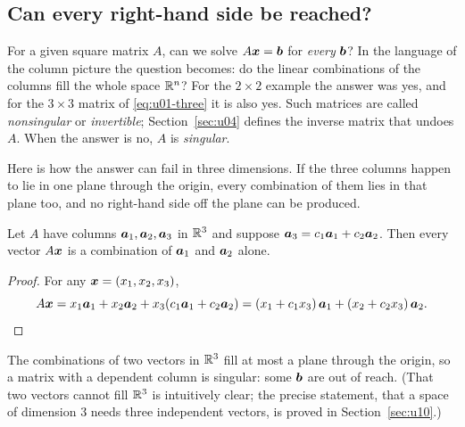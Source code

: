 \subsection{Can every right-hand side be reached?}

For a given square matrix $A$, can we solve $A\boldsymbol{x}=\boldsymbol{b}$ for \emph{every} $\boldsymbol{b}$?
In the language of the column picture the question becomes: do the linear combinations of
the columns fill the whole space $\mathbb{R}^n$? For the $2\times2$ example the answer was yes,
and for the $3\times3$ matrix of \eqref{eq:u01-three} it is also yes. Such matrices are called
\emph{nonsingular} or \emph{invertible}; Section~\ref{sec:u04} defines the inverse matrix
that undoes $A$. When the answer is no, $A$ is \emph{singular}.

Here is how the answer can fail in three dimensions. If the three columns happen to lie in
one plane through the origin, every combination of them lies in that plane too, and no
right-hand side off the plane can be produced.

\begin{proposition}\label{prop:u01-dependent}
Let $A$ have columns $\boldsymbol{a}_1,\boldsymbol{a}_2,\boldsymbol{a}_3$ in $\mathbb{R}^3$ and suppose
$\boldsymbol{a}_3 = c_1\boldsymbol{a}_1 + c_2\boldsymbol{a}_2$. Then every vector $A\boldsymbol{x}$ is a combination of
$\boldsymbol{a}_1$ and $\boldsymbol{a}_2$ alone.
\end{proposition}

\begin{proof}
For any $\boldsymbol{x}=(x_1,x_2,x_3)$,
\[
  A\boldsymbol{x} = x_1\boldsymbol{a}_1 + x_2\boldsymbol{a}_2 + x_3(c_1\boldsymbol{a}_1+c_2\boldsymbol{a}_2)
  = (x_1+c_1x_3)\,\boldsymbol{a}_1 + (x_2+c_2x_3)\,\boldsymbol{a}_2 . \qedhere
\]
\end{proof}

The combinations of two vectors in $\mathbb{R}^3$ fill at most a plane through the origin, so a
matrix with a dependent column is singular: some $\boldsymbol{b}$ are out of reach. (That two
vectors cannot fill $\mathbb{R}^3$ is intuitively clear; the precise statement, that a space of
dimension $3$ needs three independent vectors, is proved in Section~\ref{sec:u10}.)

